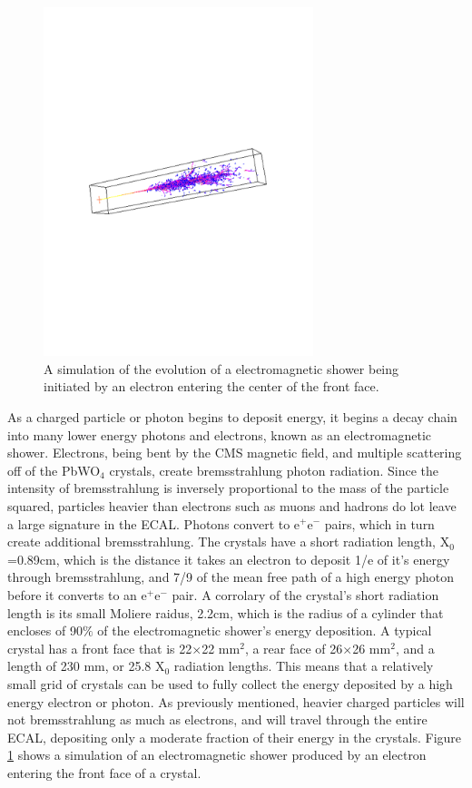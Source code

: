 \begin{figure}[h]
   \centering
  \includegraphics[width=0.7\textwidth]{Figures/CMS_Diagrams/ECAL__shower_simulation.pdf}
  \caption{A simulation of the evolution of a electromagnetic shower
    being initiated by an electron entering the center of the front face. } \label{fig:ecal_shower}
\end{figure}

\par As a charged particle or photon begins to deposit energy, it
begins a decay chain into many lower energy photons and electrons,
known as an electromagnetic shower.  Electrons, being bent by the CMS
magnetic field, and multiple scattering off of the PbWO$_{4}$
crystals, create bremsstrahlung photon radiation.  Since the intensity
of bremsstrahlung is inversely proportional to the mass of the
particle squared, particles heavier than electrons such as muons and
hadrons do lot leave a large signature in the ECAL.  Photons convert
to e$^{+}$e$^{-}$ pairs, which in turn create additional
bremsstrahlung. The crystals have a short radiation length,
X$_{0}$=0.89cm, which is the distance it takes an electron to deposit
1/e of it's energy through bremsstrahlung, and 7/9 of the mean free
path of a high energy photon before it converts to an  e$^{+}$e$^{-}$
pair.  A corrolary of the crystal's short radiation length is its
small Moliere raidus, 2.2cm, which is the radius of a cylinder that
encloses of 90$\%$ of the electromagnetic shower's energy
deposition. A typical crystal has a front face that is 22$\times$22
mm$^{2}$, a rear face of 26$\times$26 mm$^{2}$, and a length of 230
mm, or 25.8 X$_{0}$ radiation lengths.  This means that a relatively
small grid of crystals can be used to fully collect the energy
deposited by a high energy electron or photon.  As previously
mentioned, heavier charged particles will not bremsstrahlung as much
as electrons, and will travel through the entire ECAL, depositing only
a moderate fraction of their energy in the crystals.  Figure
\ref{fig:ecal_shower} shows a simulation of an electromagnetic shower
produced by an electron entering the front face of a crystal.      

